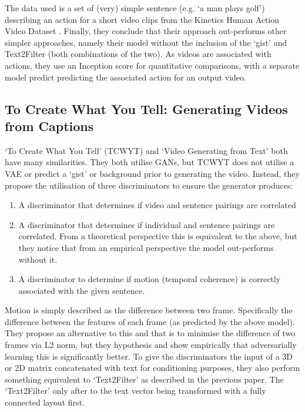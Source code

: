 \documentclass{report}
\theoremstyle{plain}
\theoremstyle{definition}
\theoremstyle{remark}
\numberwithin{equation}{section}
\numberwithin{figure}{section}
\newcommand{\<}{\langle}
\renewcommand{\>}{\rangle}
\begin{document}
The data used is a set of (very) simple sentence (e.g. `a man plays golf') describing an action for a short video clips from the Kinetics Human Action Video Dataset \cite{kay_kinetics_2017}. Finally, they conclude that their approach out-performs other simpler approaches, namely their model without the inclusion of the ‘gist’ and Text2Filter (both combinations of the two). As videos are associated with actions, they use an Inception score for quantitative comparisons, with a separate model predict predicting the associated action for an output video.

\subsection{To Create What You Tell: Generating Videos from Captions}
`To Create What You Tell' \cite{pan_create_2018} (TCWYT) and `Video Generating from Text' \cite{li_video_2017} both have many similarities. They both utilise GANs, but TCWYT does not utilise a VAE or predict a ‘gist’ or background prior to generating the video. Instead, they propose the utilisation of three discriminators to ensure the generator produces:

\begin{enumerate}
    \item A discriminator that determines if video and sentence pairings are correlated
    \item A discriminator that determines if individual and sentence pairings are correlated. From a theoretical perspective this is equivalent to the above, but they notice that from an empirical perspective the model out-performs without it.
    \item A discriminator to determine if motion (temporal coherence) is correctly associated with the given sentence.
\end{enumerate}

Motion is simply described as the difference between two frame. Specifically the difference between the features of each frame (as predicted by the above model). They propose an alternative to this and that is to minimise the difference of two frames via L2 norm, but they hypothesis and show empirically that adversarially learning this is significantly better. To give the discriminators the input of a 3D or 2D matrix concatenated with text for conditioning purposes, they also perform something equivalent to ‘Text2Filter' as described in the previous paper. The ‘Text2Filter' only after to the text vector being transformed with a fully connected layout first.
\end{document}
